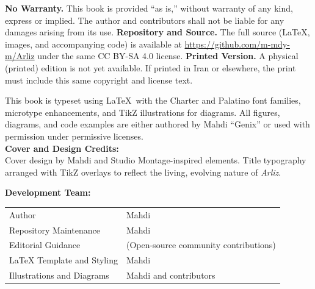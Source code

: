 \documentclass[12pt, oneside, openany]{book}
\begin{document}
\begin{center}
{\begin{itemize}
		\end{itemize}
		\vspace{1.5em}
		\textbf{No Warranty.} This book is provided “as is,” without warranty of any kind, express or implied. The author and contributors shall not be liable for any damages arising from its use.\newline
		\textbf{Repository and Source.} The full source (LaTeX, images, and accompanying code) is available at\newline
		\url{https://github.com/m-mdy-m/Arliz}\newline
		under the same CC BY-SA 4.0 license.\newline
		\vspace{1.5em}
		\textbf{Printed Version.} A physical (printed) edition is not yet available. If printed in Iran or elsewhere, the print must include this same copyright and license text.\\
		\vspace{1.5em}
		{\small
			This book is typeset using \LaTeX\ with the Charter and Palatino font families, microtype enhancements, and TikZ illustrations for diagrams. All figures, diagrams, and code examples are either authored by Mahdi “Genix” or used with permission under permissive licenses.\\
			\vspace{0.5em}
			\textbf{Cover and Design Credits:}\\
			Cover design by Mahdi and Studio Montage-inspired elements. Title typography arranged with TikZ overlays to reflect the living, evolving nature of \emph{Arliz}.\\
			\newpage
		
			\textbf{Development Team:}\\
			\vspace{1.5em}
			\begin{tabular}{@{}l l@{}}
				Author                             & Mahdi\\
				Repository Maintenance             & Mahdi\\
				Editorial Guidance                 & (Open-source community contributions) \\
				LaTeX Template and Styling         & Mahdi\\
				Illustrations and Diagrams         & Mahdi and contributors \\
			\end{tabular}
		}
	}
	\end{center}
	
	\vfill
	
\end{document}
